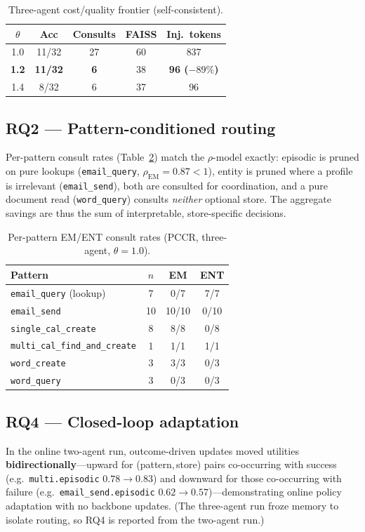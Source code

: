 \documentclass[10pt,twocolumn]{article}
\begin{document}
\begin{table}[t]
\centering\small
\begin{tabular}{@{}ccccc@{}}
\toprule
$\theta$ & Acc & Consults & FAISS & Inj.\ tokens \\
\midrule
1.0 & 11/32 & 27 & 60 & 837 \\
\textbf{1.2} & \textbf{11/32} & \textbf{6} & 38 & \textbf{96 ($-89\%$)} \\
1.4 & 8/32 & 6 & 37 & 96 \\
\bottomrule
\end{tabular}
\caption{Three-agent cost/quality frontier (self-consistent).}
\label{tab:frontier}
\end{table}

\subsection{RQ2 --- Pattern-conditioned routing}
Per-pattern consult rates (Table~\ref{tab:pattern}) match the $\rho$-model
exactly: episodic is pruned on pure lookups (\texttt{email\_query},
$\rho_{\text{EM}}{=}0.87{<}1$), entity is pruned where a profile is irrelevant
(\texttt{email\_send}), both are consulted for coordination, and a pure document
read (\texttt{word\_query}) consults \emph{neither} optional store. The
aggregate savings are thus the sum of interpretable, store-specific decisions.

\begin{table}[t]
\centering\small
\begin{tabular}{@{}lccc@{}}
\toprule
Pattern & $n$ & EM & ENT \\
\midrule
\texttt{email\_query} (lookup)        & 7  & 0/7  & 7/7 \\
\texttt{email\_send}                  & 10 & 10/10& 0/10 \\
\texttt{single\_cal\_create}          & 8  & 8/8  & 0/8 \\
\texttt{multi\_cal\_find\_and\_create}& 1  & 1/1  & 1/1 \\
\texttt{word\_create}                 & 3  & 3/3  & 0/3 \\
\texttt{word\_query}                  & 3  & 0/3  & 0/3 \\
\bottomrule
\end{tabular}
\caption{Per-pattern EM/ENT consult rates (PCCR, three-agent, $\theta{=}1.0$).}
\label{tab:pattern}
\end{table}

\subsection{RQ4 --- Closed-loop adaptation}
In the online two-agent run, outcome-driven updates moved utilities
\textbf{bidirectionally}---upward for (pattern,\,store) pairs co-occurring with
success (e.g.\ \texttt{multi.episodic} $0.78{\rightarrow}0.83$) and downward for
those co-occurring with failure (e.g.\ \texttt{email\_send.episodic}
$0.62{\rightarrow}0.57$)---demonstrating online policy adaptation with no
backbone updates. (The three-agent run froze memory to isolate routing, so RQ4
is reported from the two-agent run.)
\end{document}
